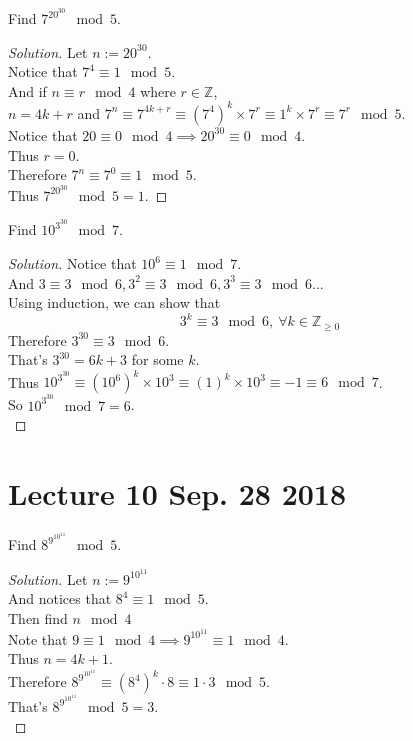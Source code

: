 \documentclass[11pt]{article}
\begin{document}
	\begin{example}
		Find $7^{20^{30}} \mod 5$.
		\begin{proof}[Solution]
			Let $n := 20^{30}$. \\
			Notice that $7^4 \equiv 1 \mod 5$. \\
			And if $n \equiv r \mod 4$ where $r \in \mathbb{Z}$, \\
			$n = 4k+r$ and $7^n \equiv 7^{4k+r} \equiv (7^4)^k \times 7^r \equiv 1^k \times 7^r \equiv 7^r \mod 5$. \\
			Notice that $20 \equiv 0 \mod 4 \implies 20^{30} \equiv 0 \mod 4$. \\
			Thus $r = 0$. \\
			Therefore $7^n \equiv 7^0 \equiv 1 \mod 5$. \\
			Thus $7^{20^{30}} \mod 5 = 1$.
		\end{proof}
	\end{example}
	
	\begin{example}
		Find $10^{3^{30}} \mod 7$.
		\begin{proof}[Solution]
			Notice that $10^6 \equiv 1 \mod 7$. \\
			And $3 \equiv 3 \mod 6, 3^2 \equiv 3 \mod 6, 3^3 \equiv 3 \mod 6 \dots $ \\
			Using induction, we can show that 
			\[
				3^k \equiv 3 \mod 6,\ \forall k \in \mathbb{Z}_{\geq 0}
			\]
			Therefore $3^{30} \equiv 3 \mod 6$. \\
			That's $3^{30} = 6k + 3$ for some $k$. \\
			Thus $10^{3^{30}} \equiv (10^6)^k \times 10^3 \equiv (1)^k \times 10^3 \equiv -1 \equiv 6 \mod 7$. \\
			So $10^{3^{30}} \mod 7 = 6$. \\
		\end{proof}
	\end{example}
	
	\section{Lecture 10 Sep. 28 2018}
	\begin{example}
		Find $8^{9^{10^{11}}} \mod 5$.
	\end{example}
	\begin{proof}[Solution]
		Let $n := 9^{10^{11}}$ \\
		And notices that $8^4 \equiv 1 \mod 5$. \\
		Then find $n \mod 4$ \\
		Note that $9 \equiv 1 \mod 4 \implies 9^{10^{11}} \equiv 1 \mod 4$. \\
		Thus $n = 4k + 1$. \\
		Therefore $8^{9^{{10}^{11}}} \equiv (8^4)^k \cdot 8 \equiv 1 \cdot 3 \mod 5$. \\
		That's $8^{9^{10^{11}}} \mod 5 = 3$. \\
	\end{proof}
	
\end{document}
